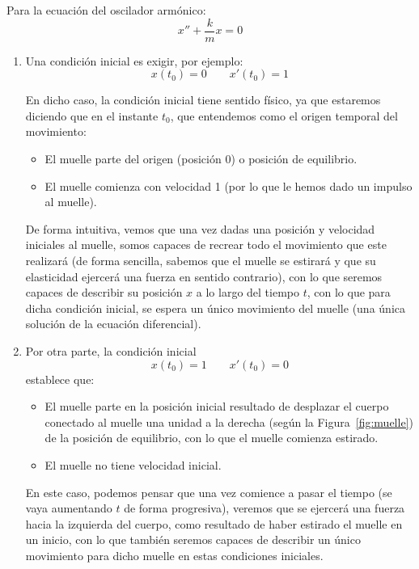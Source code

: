 \begin{ejemplo}
    Para la ecuación del oscilador armónico:
    \begin{equation*}
        x'' + \dfrac{k}{m}x = 0
    \end{equation*}

    \begin{enumerate}
        \item Una condición inicial es exigir, por ejemplo:
            \begin{equation*}
                x(t_0) = 0 \qquad x'(t_0) = 1
            \end{equation*}

            En dicho caso, la condición inicial tiene sentido físico, ya que estaremos diciendo que en el instante $t_0$, que entendemos como el origen temporal del movimiento:
            \begin{itemize}
                \item El muelle parte del origen (posición 0) o posición de equilibrio.
                \item El muelle comienza con velocidad 1 (por lo que le hemos dado un impulso al muelle).
            \end{itemize}
            De forma intuitiva, vemos que una vez dadas una posición y velocidad iniciales al muelle, somos capaces de recrear todo el movimiento que este realizará (de forma sencilla, sabemos que el muelle se estirará y que su elasticidad ejercerá una fuerza en sentido contrario), con lo que seremos capaces de describir su posición $x$ a lo largo del tiempo $t$, con lo que para dicha condición inicial, se espera un único movimiento del muelle (una única solución de la ecuación diferencial).\\

        \item Por otra parte, la condición inicial
            \begin{equation*}
                x(t_0) = 1 \qquad x'(t_0) = 0
            \end{equation*}
            establece que:
            \begin{itemize}
                \item El muelle parte en la posición inicial resultado de desplazar el cuerpo conectado al muelle una unidad a la derecha (según la Figura~\ref{fig:muelle}) de la posición de equilibrio, con lo que el muelle comienza estirado.
                \item El muelle no tiene velocidad inicial.
            \end{itemize}
            En este caso, podemos pensar que una vez comience a pasar el tiempo (se vaya aumentando $t$ de forma progresiva), veremos que se ejercerá una fuerza hacia la izquierda del cuerpo, como resultado de haber estirado el muelle en un inicio, con lo que también seremos capaces de describir un único movimiento para dicho muelle en estas condiciones iniciales.
    \end{enumerate}
\end{ejemplo}


